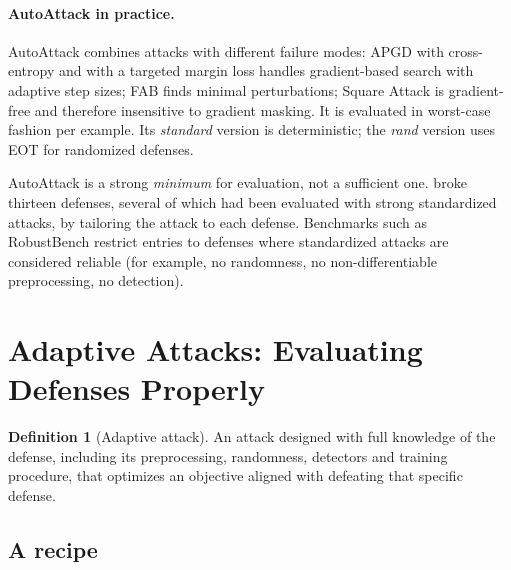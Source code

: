 \documentclass[10pt,a4paper]{extarticle}
\theoremstyle{definition}
\newtheorem{definition}{Definition}[section]
\begin{document}
\paragraph{AutoAttack in practice.} AutoAttack combines attacks with different failure modes: APGD with cross-entropy and with a targeted margin loss handles gradient-based search with adaptive step sizes; FAB finds minimal perturbations; Square Attack is gradient-free and therefore insensitive to gradient masking. It is evaluated in worst-case fashion per example. Its \emph{standard} version is deterministic; the \emph{rand} version uses EOT for randomized defenses.

\begin{warnbox}
AutoAttack is a strong \emph{minimum} for evaluation, not a sufficient one. \citet{tramer2020adaptive} broke thirteen defenses, several of which had been evaluated with strong standardized attacks, by tailoring the attack to each defense. Benchmarks such as RobustBench restrict entries to defenses where standardized attacks are considered reliable (for example, no randomness, no non-differentiable preprocessing, no detection).
\end{warnbox}

\section{Adaptive Attacks: Evaluating Defenses Properly}\label{sec:adaptive}

\begin{definition}[Adaptive attack]
An attack designed with full knowledge of the defense, including its preprocessing, randomness, detectors and training procedure, that optimizes an objective aligned with defeating that specific defense.
\end{definition}

\subsection{A recipe}
\end{document}
